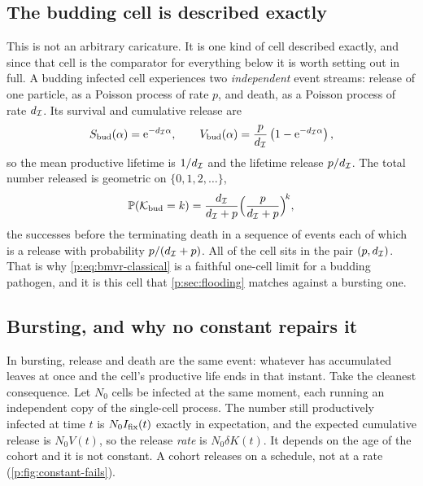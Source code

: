\subsection{The budding cell is described exactly}
\label{p:sec:budding}

This is not an arbitrary caricature. It is one kind of cell described
exactly, and since that cell is the comparator for everything below it is
worth setting out in full. A budding infected cell experiences two
\emph{independent} event streams: release of one particle, as a Poisson
process of rate $p$, and death, as a Poisson process of rate $d_{\mathcal{I}}$.
Its survival and cumulative release are
\begin{equation}
S_{\rm bud}(\alpha)=\mathrm{e}^{-d_{\mathcal{I}}\alpha},\qquad
V_{\rm bud}(\alpha)=\frac{p}{d_{\mathcal{I}}}\left(1-\mathrm{e}^{-d_{\mathcal{I}}\alpha}\right),
\label{p:eq:bud-cell}
\end{equation}
so the mean productive lifetime is $1/d_{\mathcal{I}}$ and the lifetime release
$p/d_{\mathcal{I}}$. The total number released is geometric on
$\{0,1,2,\ldots\}$,
\begin{equation}
\mathbb{P}\!\left(\mathcal{K}_{\rm bud}=k\right)=\frac{d_{\mathcal{I}}}{d_{\mathcal{I}}+p}
\Bigl(\frac{p}{d_{\mathcal{I}}+p}\Bigr)^{\!k},
\label{p:eq:bud-geom}
\end{equation}
the successes before the terminating death in a sequence of events each of
which is a release with probability $p/(d_{\mathcal{I}}+p)$. All of the cell sits
in the pair $(p,d_{\mathcal{I}})$. That is why \cref{p:eq:bmvr-classical} is a
faithful one-cell limit for a budding pathogen, and it is this cell that
\cref{p:sec:flooding} matches against a bursting one.

\subsection{Bursting, and why no constant repairs it}
\label{p:sec:obstruction}

In bursting, release and death are the same event: whatever has accumulated
leaves at once and the cell's productive life ends in that instant. Take the
cleanest consequence. Let $N_0$ cells be infected at the same moment, each
running an independent copy of the single-cell process. The number still
productively infected at time $t$ is $N_0I_{\mathrm{fix}}(t)$ exactly in expectation,
and the expected cumulative release is $N_0V(t)$, so the release
\emph{rate} is $N_0\delta K(t)$. It depends on the age of the cohort and it
is not constant. A cohort releases on a schedule, not at a rate
(\cref{p:fig:constant-fails}).

